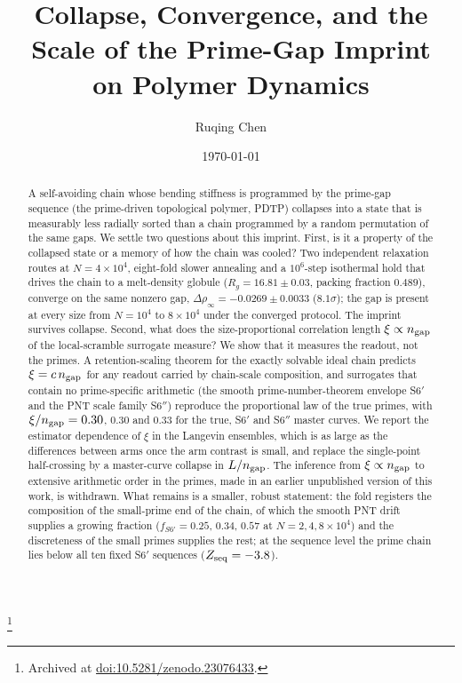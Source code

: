 \documentclass[reprint,amsmath,amssymb,aps,pre,longbibliography]{revtex4-2}
\begin{document}
\title{Collapse, Convergence, and the Scale of the Prime-Gap Imprint\\on Polymer Dynamics}

\author{Ruqing Chen}
\thanks{Archived at \href{https://doi.org/10.5281/zenodo.23076433}{doi:10.5281/zenodo.23076433}.}

\date{\today}

\begin{abstract}
A self-avoiding chain whose bending stiffness is programmed by the prime-gap sequence
(the prime-driven topological polymer, PDTP) collapses into a state that is measurably less
radially sorted than a chain programmed by a random permutation of the same gaps. We settle
two questions about this imprint. First, is it a property of the collapsed state or a memory
of how the chain was cooled? Two independent relaxation routes at $N=4\times10^{4}$,
eight-fold slower annealing and a $10^{6}$-step isothermal hold that drives the chain to a
melt-density globule ($R_g=16.81\pm0.03$, packing fraction $0.489$), converge on the same
nonzero gap, $\Delta\rho_\infty=-0.0269\pm0.0033$ ($8.1\sigma$); the gap is present at every
size from $N=10^{4}$ to $8\times10^{4}$ under the converged protocol. The imprint survives
collapse. Second, what does the size-proportional correlation length $\xi\propto n_{\rm gap}$
of the local-scramble surrogate measure? We show that it measures the readout, not the
primes. A retention-scaling theorem for the exactly solvable ideal chain predicts
$\xi=c\,n_{\rm gap}$ for any readout carried by chain-scale composition, and surrogates that
contain no prime-specific arithmetic (the smooth prime-number-theorem envelope S6$'$ and
the PNT scale family S6$''$) reproduce the proportional law of the true primes, with
$\xi/n_{\rm gap}=0.30$, $0.30$ and $0.33$ for the true, S6$'$ and S6$''$ master curves.
We report the estimator dependence of $\xi$ in the Langevin ensembles, which is as large as
the differences between arms once the arm contrast is small, and replace the single-point
half-crossing by a master-curve collapse in $L/n_{\rm gap}$. The inference from
$\xi\propto n_{\rm gap}$ to extensive arithmetic order in the primes, made in an earlier
unpublished version of this work, is withdrawn. What remains is a smaller, robust statement:
the fold registers the composition of the small-prime end of the chain, of which the smooth
PNT drift supplies a growing fraction ($f_{S6'}=0.25$, $0.34$, $0.57$ at $N=2,4,8\times10^{4}$)
and the discreteness of the small primes supplies the rest; at the sequence level the prime
chain lies below all ten fixed S6$'$ sequences ($Z_{\rm seq}=-3.8$).
\end{abstract}
\end{document}
